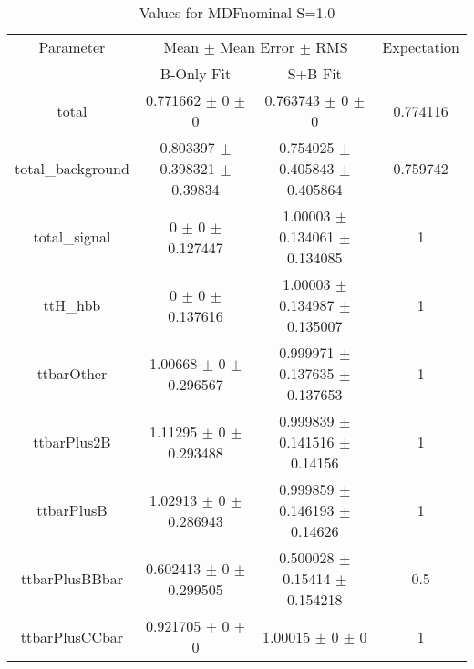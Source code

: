 \begin{table}
\centering
\caption{Values for MDFnominal S=1.0}
\begin{tabular}{cccc}
\toprule
Parameter & \multicolumn{2}{c}{Mean $\pm$ Mean Error $\pm$ RMS} & Expectation\\
 & B-Only Fit & S+B Fit & \\
\midrule
total & \num{0.771662} $\pm$ \num{0} $\pm$ \num{0} & \num{0.763743} $\pm$ \num{0} $\pm$ \num{0} & \num{0.774116}\\
total\_background & \num{0.803397} $\pm$ \num{0.398321} $\pm$ \num{0.39834} & \num{0.754025} $\pm$ \num{0.405843} $\pm$ \num{0.405864} & \num{0.759742}\\
total\_signal & \num{0} $\pm$ \num{0} $\pm$ \num{0.127447} & \num{1.00003} $\pm$ \num{0.134061} $\pm$ \num{0.134085} & \num{1}\\
ttH\_hbb & \num{0} $\pm$ \num{0} $\pm$ \num{0.137616} & \num{1.00003} $\pm$ \num{0.134987} $\pm$ \num{0.135007} & \num{1}\\
ttbarOther & \num{1.00668} $\pm$ \num{0} $\pm$ \num{0.296567} & \num{0.999971} $\pm$ \num{0.137635} $\pm$ \num{0.137653} & \num{1}\\
ttbarPlus2B & \num{1.11295} $\pm$ \num{0} $\pm$ \num{0.293488} & \num{0.999839} $\pm$ \num{0.141516} $\pm$ \num{0.14156} & \num{1}\\
ttbarPlusB & \num{1.02913} $\pm$ \num{0} $\pm$ \num{0.286943} & \num{0.999859} $\pm$ \num{0.146193} $\pm$ \num{0.14626} & \num{1}\\
ttbarPlusBBbar & \num{0.602413} $\pm$ \num{0} $\pm$ \num{0.299505} & \num{0.500028} $\pm$ \num{0.15414} $\pm$ \num{0.154218} & \num{0.5}\\
ttbarPlusCCbar & \num{0.921705} $\pm$ \num{0} $\pm$ \num{0} & \num{1.00015} $\pm$ \num{0} $\pm$ \num{0} & \num{1}\\
\bottomrule
\end{tabular}
\end{table}